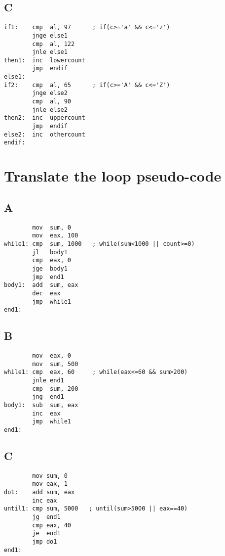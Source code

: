 \documentclass{hitec}
\begin{document}
\begin{minipage}{\linewidth}
\subsection*{C}
\begin{verbatim}
if1:    cmp  al, 97      ; if(c>='a' && c<='z')
        jnge else1
        cmp  al, 122
        jnle else1
then1:  inc  lowercount
        jmp  endif
else1:  
if2:    cmp  al, 65      ; if(c>='A' && c<='Z')
        jnge else2
        cmp  al, 90
        jnle else2
then2:  inc  uppercount
        jmp  endif
else2:  inc  othercount
endif:
\end{verbatim}
\end{minipage}
\begin{minipage}{\linewidth}
\section{Translate the loop pseudo-code}
\subsection*{A}
\begin{verbatim}
        mov  sum, 0
        mov  eax, 100
while1: cmp  sum, 1000   ; while(sum<1000 || count>=0)
        jl   body1
        cmp  eax, 0
        jge  body1
        jmp  end1
body1:  add  sum, eax
        dec  eax
        jmp  while1
end1:
\end{verbatim}
\end{minipage}
\begin{minipage}{\linewidth}
\subsection*{B}
\begin{verbatim}
        mov  eax, 0
        mov  sum, 500
while1: cmp  eax, 60     ; while(eax<=60 && sum>200)
        jnle end1
        cmp  sum, 200
        jng  end1
body1:  sub  sum, eax
        inc  eax
        jmp  while1
end1:   
\end{verbatim}
\end{minipage}
\begin{minipage}{\linewidth}
\subsection*{C}
\begin{verbatim}
        mov sum, 0
        mov eax, 1
do1:    add sum, eax
        inc eax
until1: cmp sum, 5000   ; until(sum>5000 || eax==40)
        jg  end1
        cmp eax, 40
        je  end1
        jmp do1
end1:   
\end{verbatim}
\end{minipage}
\end{document}
